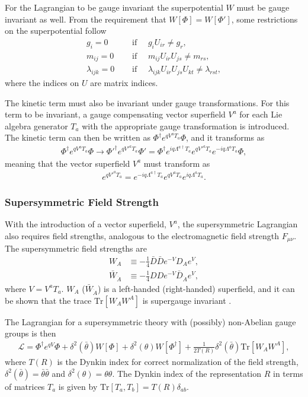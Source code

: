 \documentclass[twoside,english]{uiofysmaster}
\begin{document}
For the Lagrangian to be gauge invariant the superpotential $W$ must be gauge invariant as well. From the requirement that $W[\Phi] = W[\Phi']$, some restrictions on the superpotential follow
\begin{align}
g_i = 0 \quad &\text{ if } \quad g_i U_{ir} \neq g_r,\\
m_{ij} = 0 \quad &\text{ if } \quad m_{ij} U_{ir} U_{js} \neq m_{rs},\\
\lambda_{ijk} = 0 \quad &\text{ if } \quad \lambda_{ijk}U_{ir}U_{js}U_{kt} \neq \lambda_{rst},
\end{align} 
where the indices on $U$ are matrix indices. 

The kinetic term must also be invariant under gauge transformations. For this term to be invariant, a gauge compensating vector superfield $V^a$ for each Lie algebra generator $T_a$ with the appropriate gauge transformation is introduced. The kinetic term can then be written as $\Phi^{\dagger} e^{qV^aT_a} \Phi$, and it transforms as
\begin{align}
\Phi^{\dagger} e^{qV^aT_a} \Phi \rightarrow {\Phi'}^{\dagger} e^{q{V'}^aT_a} \Phi' = \Phi^{\dagger} e^{iq\Lambda^{a \dagger} T_a} e^{q{V'}^aT_a} e^{-iq \Lambda^a T_a} \Phi,
\end{align}
meaning that the vector superfield $V^a$ must transform as
\begin{align}
e^{q{V'}^a T_a} = e^{-iq \Lambda^{a \dagger} T_a} e^{qV^aT_a} e^{iq\Lambda^a T_a}.
\end{align}

\subsubsection{Supersymmetric Field Strength}

With the introduction of a vector superfield, $V^a$, the supersymmetric Lagrangian also requires field strengths, analogous to the electromagnetic field strength $F_{\mu \nu}$. The supersymmetric field strengths are 
\begin{align}
W_A & \equiv - \frac{1}{4} \bar{D} \bar{D} e^{-V} D_A e^V,\\
\bar{W}_{\dot{A}} & \equiv - \frac{1}{4} DDe^{-V}\bar{D}_{\dot{A}} e^V,
\end{align}
where $V = V^a T_a$. $W_A$ ($\bar{W}_{\dot{A}}$) is a left-handed (right-handed) superfield, and it can be shown that the trace $\text{Tr}[W_AW^A]$ is supergauge invariant \cite{batzing2017lecture}. 

The Lagrangian for a supersymmetric theory with (possibly) non-Abelian gauge groups is then
\begin{align}
\mathcal{L} = \Phi^{\dagger} e^{qV} \Phi + \delta^2 (\bar{\theta}) W[\Phi] + \delta^2 (\theta) W[\Phi^{\dagger}] + \frac{1}{2T(R)} \delta^2 (\bar{\theta}) \text{Tr}[W_AW^A],
\end{align}
where $T(R)$ is the Dynkin index for correct normalization of the field strength, $\delta^2(\bar{\theta}) = \bar{\theta} \bar{\theta}$ and $\delta^2(\theta) = \theta \theta$. The Dynkin index of the representation $R$ in terms of matrices $T_a$ is given by $\text{Tr}[T_a, T_b] = T(R) \delta_{ab}$.
\end{document}
